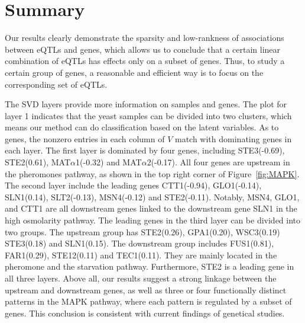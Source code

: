\section{Summary}\label{sec:summary}


Our results clearly demonstrate the sparsity and low-rankness of associations between eQTLs and genes, which allows us to conclude that a certain linear combination of eQTLs has effects only on a subset of genes. Thus, to study a certain group of genes, a reasonable and efficient way is to focus on the corresponding  set of eQTLs.

The SVD layers provide more information on samples and genes. The plot for layer 1 indicates that the yeast samples can be divided into two clusters, which means our method can do classification based on the latent variables. As to genes, the nonzero entries in each column of $V$ match with dominating genes in each layer. The first layer is dominated by four genes, including STE3(-0.69), STE2(0.61), MAT$\alpha$1(-0.32) and MAT$\alpha$2(-0.17). All four genes are upstream in the pheromones pathway, as shown in the top right corner of Figure~\ref{fig:MAPK}. The second layer include the leading genes CTT1(-0.94), GLO1(-0.14), SLN1(0.14), SLT2(-0.13), MSN4(-0.12) and STE2(-0.11). Notably, MSN4, GLO1, and CTT1 are all downstream genes linked to the downstream gene SLN1 in the high osmolarity pathway. The leading genes in the third layer can be divided into two groups. The upstream group has STE2(0.26), GPA1(0.20), WSC3(0.19) STE3(0.18) and SLN1(0.15). The downstream group includes FUS1(0.81), FAR1(0.29), STE12(0.11) and TEC1(0.11). They are mainly located in the pheromone and the starvation pathway. Furthermore, STE2 is a leading gene in all three layers. Above all, our results suggest a strong linkage between the upstream and downstream genes, as well as three or four  functionally distinct patterns in the MAPK pathway, where each pattern is regulated by a subset of genes.  This conclusion is consistent with current findings of genetical studies.
